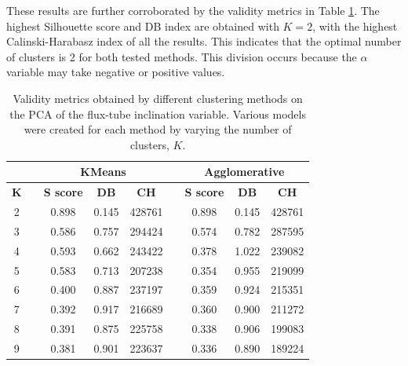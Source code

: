These results are further corroborated by the validity metrics in Table \ref{tab:pca_a}. The highest Silhouette score and DB index are obtained with $K=2$, with the highest Calinski-Harabasz index of all the results. This indicates that the optimal number of clusters is 2 for both tested methods. This division occurs because the $\alpha$ variable may take negative or positive values.

\begin{table}[]
\caption[Validity metrics for PCA of the Flux-tube Inclination]{Validity metrics obtained by different clustering methods on the PCA of the flux-tube inclination variable. Various models were created for each method by varying the number of clusters, $K$.}\label{tab:pca_a}
\begin{tabular}{@{}ccccccccc@{}}
\toprule
\multicolumn{1}{l}{} & \multicolumn{1}{l}{}          & \multicolumn{3}{c}{\textbf{KMeans}}          & \multicolumn{1}{l}{\textbf{}} & \multicolumn{3}{c}{\textbf{Agglomerative}}   \\ \midrule
\textbf{K}           & \multicolumn{1}{l}{\textbf{}} & \textbf{S score} & \textbf{DB} & \textbf{CH} & \multicolumn{1}{l}{\textbf{}} & \textbf{S score} & \textbf{DB} & \textbf{CH} \\ \midrule
2                    &                               & 0.898            & 0.145       & 428761      &                               & 0.898            & 0.145       & 428761      \\
3                    &                               & 0.586            & 0.757       & 294424      &                               & 0.574            & 0.782       & 287595      \\
4                    &                               & 0.593            & 0.662       & 243422      &                               & 0.378            & 1.022       & 239082      \\
5                    &                               & 0.583            & 0.713       & 207238      &                               & 0.354            & 0.955       & 219099      \\
6                    &                               & 0.400            & 0.887       & 237197      &                               & 0.359            & 0.924       & 215351      \\
7                    &                               & 0.392            & 0.917       & 216689      &                               & 0.360            & 0.900       & 211272      \\
8                    &                               & 0.391            & 0.875       & 225758      &                               & 0.338            & 0.906       & 199083      \\
9                    &                               & 0.381            & 0.901       & 223637      &                               & 0.336            & 0.890       & 189224      \\ \bottomrule
\end{tabular}
\end{table}

